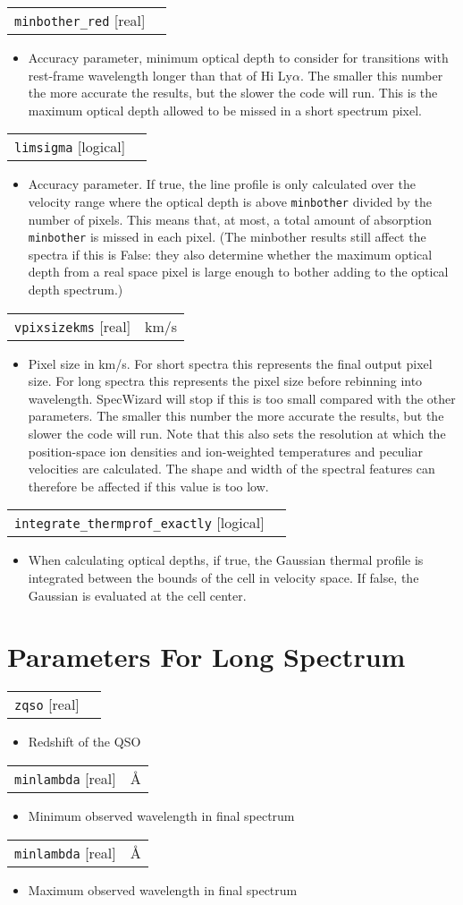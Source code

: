 \documentclass{report}
\makeatletter
\newcommand{\paramdefinition}[3]{
\begin{tabular*}{\textwidth}{l@{\extracolsep{\fill}}r}
		{\tt #1} [{\sc #2}]& #3 \\
\end{tabular*}}
\newcommand{\paramdescription}[1]{
\begin{itemize}
\item #1
\end{itemize}\vspace{0.2cm}}
\makeatother
\begin{document}
\paramdefinition{minbother\_red}{real}{}
\paramdescription{Accuracy parameter, minimum optical depth to consider for transitions with rest-frame wavelength longer than that of H{\sc i} Ly$\alpha$.  The smaller this number the more accurate the results, but the slower the code will run. This is the maximum optical depth allowed to be missed in a short spectrum pixel.}

\paramdefinition{limsigma}{logical}{}
\paramdescription{Accuracy parameter. If true, the line profile is only calculated over the velocity range where the optical depth is above {\tt minbother} divided by the number of pixels. This means that, at most, a total amount of absorption {\tt minbother} is missed in each pixel. (The minbother results still affect the spectra if this is False: they also determine whether the maximum optical depth from a real space pixel is large enough to bother adding to the optical depth spectrum.)}

\paramdefinition{vpixsizekms}{real}{km/s}
\paramdescription{Pixel size in km/s.  For short spectra this represents the final output pixel size.  For long spectra this represents the pixel size before rebinning into wavelength. SpecWizard will stop if this is too small compared with the other parameters. The smaller this number the more accurate the results, but the slower the code will run. Note that this also sets the resolution at which the position-space ion densities and ion-weighted temperatures and peculiar velocities are calculated. The shape and width of the spectral features can therefore be affected if this value is too low.}

\paramdefinition{integrate\_thermprof\_exactly}{logical}{}
\paramdescription{When calculating optical depths, if true, the Gaussian thermal profile is integrated between the bounds of the cell in velocity space. If false, the Gaussian is evaluated at the cell center.}


\section{Parameters For Long Spectrum}

\paramdefinition{zqso}{real}{}
\paramdescription{Redshift of the QSO}

\paramdefinition{minlambda}{real}{\AA{}}
\paramdescription{Minimum observed wavelength in final spectrum}

\paramdefinition{minlambda}{real}{\AA{}}
\paramdescription{Maximum observed wavelength in final spectrum}
\end{document}
